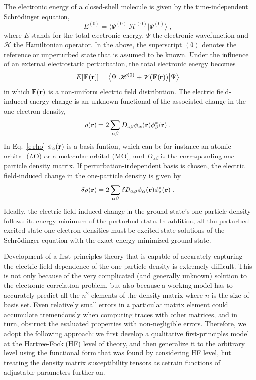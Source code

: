 \documentclass[aip,amsmath,amssymb,reprint,floatfix]{revtex4-1}
\newcommand{\tbraket}[3]{\ensuremath{\bigl\langle {#1} \bigl\lvert {#2} \bigl\lvert {#3} \bigr\rangle}}
\begin{document}
The electronic energy of a closed\hyp{}shell molecule is given by the time\hyp{}independent Schr{\"o}dinger equation,
%
\begin{equation}
 E^{(0)} = \tbraket{\Psi^{(0)}}{\mathscr{H}^{(0)}}{\Psi^{(0)}} \;,
\end{equation}
%
where $E$ stands for the total electronic energy, $\Psi$ the electronic wavefunction and $\mathscr{H}$
the Hamiltonian operator. In the above, the superscript $(0)$
denotes the reference or unperturbed state that is assumed to be known.
Under the influence of an external electrostatic perturbation, the total electronic energy
becomes
%
\begin{equation}
 E[{\bf F}({\bf r})] = \tbraket{\Psi}{\mathscr{H}^{(0)} + \mathscr{V}({\bf F}({\bf r}))}{\Psi}
\end{equation}
%
in which ${\bf F}({\bf r})$ is a non\hyp{}uniform electric field distribution.
The electric field\hyp{}induced energy change is an unknown functional 
of the associated change in the one\hyp{}electron density,
%
\begin{equation}\label{e:rho}
 \rho({\bf r}) = 2\sum_{\alpha\beta} D_{\alpha\beta} \phi_\alpha({\bf r}) \phi^*_\beta({\bf r}) \;.
\end{equation}
%
In Eq.~\eqref{e:rho} $\phi_\alpha({\bf r})$ is a basis funtion, which can be for instance 
an atomic orbital (AO) or a molecular orbital (MO), and $D_{\alpha\beta}$ is the corresponding
one\hyp{}particle density matrix.
If perturbation\hyp{}independent basis is chosen, the electric field\hyp{}induced change in the one\hyp{}particle density
is given by
%
\begin{equation}\label{e:rho-1}
 \delta \rho({\bf r}) = 2\sum_{\alpha\beta} \delta D_{\alpha\beta} \phi_\alpha({\bf r}) \phi^*_\beta({\bf r}) \;.
\end{equation}
%
Ideally, the electric field\hyp{}induced change in the ground state's one\hyp{}particle density 
follows its energy minimum of the perturbed state. In addition, all the perturbed 
excited state one\hyp{}electron densities must be excited state solutions of the Schr{\"o}dinger equation
with the exact energy\hyp{}minimized ground state. 

Development of a first\hyp{}principles theory
that is capable of accurately capturing the electric field\hyp{}dependence of the one\hyp{}particle density
is extremely difficult. This is not only because of the very complicated (and generally unknown) solution
to the electronic correlation problem, but also because
a working model has to accurately predict all the $n^2$ elements of the density matrix
where $n$ is the size of basis set. Even relatively small errors
in a particular matrix element could accumulate tremendously when computing traces with other matrices,
and in turn, obstruct the evaluated properties with non\hyp{}negligible errors.
Therefore, we adopt the following approach: we first develop a qualitative first\hyp{}principles model 
at the Hartree\hyp{}Fock (HF)
level of theory, and then generalize it to the arbitrary level using the functional form that was found 
by considering HF level,
but treating the density matrix susceptibility tensors as cetrain functions of adjustable parameters further on.
\end{document}
